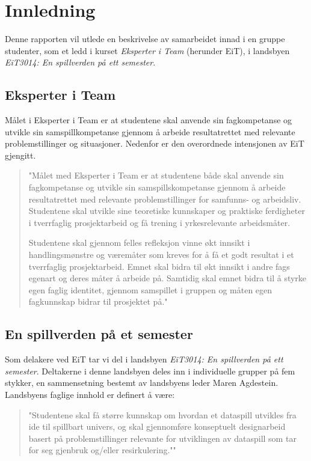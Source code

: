 \section{Innledning}
Denne rapporten vil utlede en beskrivelse av samarbeidet innad i en gruppe studenter, som et ledd i kurset \emph{Eksperter i Team} (herunder EiT), i landsbyen \emph{EiT3014: En spillverden på ett semester}.

\subsection{Eksperter i Team} Målet i Eksperter i Team er at studentene
skal anvende sin fagkompetanse og utvikle sin samspillkompetanse gjennom
å arbeide resultatrettet med relevante problemstillinger og situasjoner.
Nedenfor er den overordnede intensjonen av EiT gjengitt.

\begin{quotation}"Målet med Eksperter i Team er at studentene både skal anvende
sin fagkompetanse og utvikle sin samspillskompetanse gjennom å arbeide
resultatrettet med relevante problemstillinger for samfunns- og
arbeidsliv. Studentene skal utvikle sine teoretiske kunnskaper og
praktiske ferdigheter i tverrfaglig prosjektarbeid og få trening i
yrkesrelevante arbeidsmåter.

Studentene skal gjennom felles refleksjon vinne økt innsikt i
handlingsmønstre og væremåter som kreves for å få et godt resultat i et
tverrfaglig prosjektarbeid. Emnet skal bidra til økt innsikt i andre
fags egenart og deres måter å arbeide på. Samtidig skal emnet bidra til
å styrke egen faglig identitet, gjennom samspillet i gruppen og måten
egen fagkunnskap bidrar til prosjektet på."
\end{quotation}

\subsection{En spillverden på et semester} Som delakere ved EiT tar vi
del i landsbyen \emph{EiT3014: En spillverden på ett semester}.
Deltakerne i denne landsbyen deles inn i individuelle grupper på fem
stykker, en sammensetning bestemt av landsbyens leder Maren Agdestein.
Landsbyens faglige innhold er definert å være: 

\begin{quotation}
"Studentene skal få større kunnskap om hvordan et dataspill utvikles fra 
ide til spillbart univers, og skal gjennomføre konseptuelt designarbeid 
basert på problemstillinger relevante for utviklingen av dataspill som 
tar for seg gjenbruk og/eller resirkulering.""
\end{quotation}

